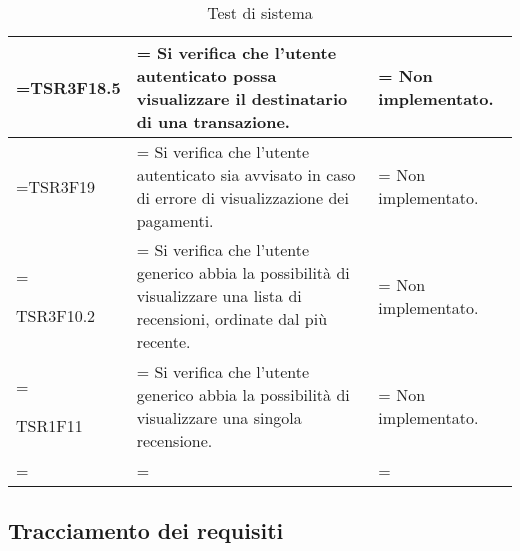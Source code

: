 \begin{xltabular}{\textwidth} {
        >{\hsize\linewidth=\hsize}X
        >{\hsize\linewidth=\hsize}X
        >{\hsize\linewidth=\hsize}X
    }
    TSR3F18.5 &
    Si verifica che l'utente autenticato possa visualizzare il destinatario di una transazione. &
    Non implementato.
    \\ \hline

    TSR3F19 &
    Si verifica che l'utente autenticato sia avvisato in caso di errore di visualizzazione dei pagamenti. &
    Non implementato.
    \\ \hline

    TSR3F10.2 &
    Si verifica che l'utente generico abbia la possibilità di visualizzare una lista di recensioni,
    ordinate dal più recente.  &
    Non implementato.
    \\ \hline

    TSR1F11 &
    Si verifica che l'utente generico abbia la possibilità di visualizzare una singola recensione.  &
    Non implementato.
    \\ \hline


    \caption{Test di sistema}
\end{xltabular}

\subsection{Tracciamento dei requisiti}

